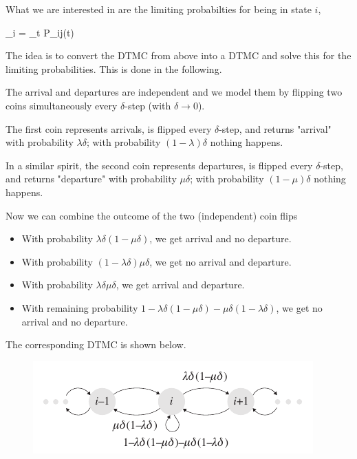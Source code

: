 What we are interested in are the limiting probabilties for being in state $i$,

\bee
\pi_i = \lim_{t \rightarrow \infty} P_{ij}(t)
\eee

The idea is to convert the DTMC from above into a DTMC and solve this for the limiting probabilities. This is done in the following. 

The arrival and departures are independent and we model them by flipping two coins simultaneously every $\delta$-step (with $\delta \rightarrow 0$).

The first coin represents arrivals, is flipped every $\delta$-step, and returns "arrival" with probability $\lambda \delta$; with probability $(1-\lambda)\delta$ nothing happens.

In a similar spirit, the second coin represents departures, is flipped every $\delta$-step, and returns "departure" with probability $\mu \delta$; with probability $(1-\mu)\delta$ nothing happens.

Now we can combine the outcome of the two (independent) coin flips

\begin{itemize}

\item With probability $\lambda \delta (1-\mu \delta)$, we get arrival and no departure.

\item With probability $(1 - \lambda \delta) \mu \delta$, we get no arrival and departure.

\item With probability $\lambda \delta \mu \delta$, we get arrival and departure.

\item With remaining probability $1 - \lambda \delta (1 - \mu \delta)-\mu\delta(1-\lambda \delta)$, we get no arrival and no departure.

\end{itemize}

The corresponding DTMC is shown below.

\begin{figure}[hbt]
\centering
\includegraphics[scale=0.75]{images/queuing_02_03.png}
\end{figure}

